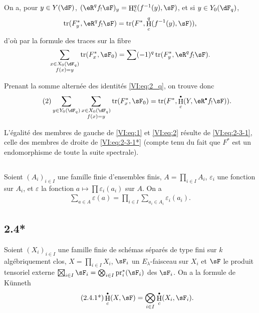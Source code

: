 \documentclass[oneside]{book}
\DeclareMathOperator{\h}{H}
\DeclareMathOperator{\tr}{tr}
\newcommand{\pr}{\mathrm{pr}} %
\theoremstyle{sga-source}
\theoremstyle{sga-source-dash}
\theoremstyle{sga-source-dotdash}
\theoremstyle{sga-source-number-note-dash}
\theoremstyle{sga-source-note-number-dotdash}
\theoremstyle{sga-source-example-dotdash}
\theoremstyle{sga-source-inline-number}
\theoremstyle{sga-source-bare-number}
\theoremstyle{sga-source}
\newcommand{\bigboxtimes}{\mathop{\vphantom{\sum}\mathchoice
  {\vcenter{\hbox{\huge $\boxtimes$}}}
  {\vcenter{\hbox{\Large $\boxtimes$}}}{\boxtimes}{\boxtimes}}\displaylimits}
\let\oldbullet\bullet
\renewcommand{\bullet}{\textnormal{\tiny$\oldbullet$}}
\newcommand{\PrintPage}[1]{}\newcommand{\MathPage}[1]{}\newcommand{\PrintCite}[2]{#1}\newcommand{\var}[3]{#2}
\begin{document}
On a, pour $y\in Y(\dF)$, $(\eR^q f_! \sF)_y = \h_c^q(f^{-1}(y),\sF)$, et si 
$y\in Y_0(\dF_q)$, 
\[
  \tr(F_y^\ast,\eR^q f_! \sF) = \tr(F^\ast,\h_c^q(f^{-1}(y),\sF)) \text{,}
\]
d'où par la formule des traces sur la fibre 
\[
  \sum_{\substack{x\in X_0(\dF_q) \\ f(x) = y}} \tr(F_x^\ast,\sF_0) = \sum (-1)^q \tr(F_y^\ast,\eR^q f_! \sF) \text{.}
\]
\PrintPage{185}
Prenant la somme alternée des identités \eqref{VI:eq:2_q}, on trouve donc 
\begin{align*}\tag{2}\label{VI:eq:2}
  \sum_{y\in Y_0(\dF_q)} \sum_{\substack{x \in X_0(\dF_q) \\ f(x) = y}} \tr(F_x^\ast,\sF_0) = \var{\tr(F^\ast,\h^\bullet(Y,\eR^\bullet f_! \sF))}{\tr(F^\ast,\h_c^\bullet(Y,\eR^\bullet f_! \sF))}{S45-SOL-0738} \text{.}
\end{align*}

L'égalité des membres de gauche de \eqref{VI:eq:1} et \eqref{VI:eq:2} 
résulte de \eqref{VI:eq:2-3-1}, celle des membres de droite de 
\eqref{VI:eq:2-3-1*} (compte tenu du fait que $F^\ast$ est un endomorphisme de 
toute la suite spectrale). 





\subsection{}\label{VI:2-4}

Soient $(A_i)_{i\in I}$ une famille finie d'ensembles finis, 
$A=\prod_{i\in I} A_i$, $\varepsilon_i$ une fonction sur $A_i$, et 
$\varepsilon$ la fonction $a\mapsto \prod \varepsilon_i(a_i)$ sur $A$. On a 
\begin{align*}\tag{2.4.1}\label{VI:eq:2-4-1}
  \sum_{a\in A} \varepsilon(a) = \prod_{i\in I} \sum_{a_i\in A_i} \varepsilon_i(a_i) \text{.}
\end{align*}





\subsection*{2.4*}\label{VI:2-4*}

Soient $(X_i)_{i\in I}$ une famille finie de schémas séparés de type fini 
sur $k$ algébriquement clos, $X=\prod_{i\in I} X_i$, $\sF_i$ un 
$E_\lambda$-faisceau sur $X_i$ et $\sF$ le produit tensoriel externe 
$\bigboxtimes_{i\in I}\sF_i = \bigotimes_{i\in I} \pr_i^\ast(\sF_i)$ 
des $\sF_i$. On a la formule de K\"unneth 
\begin{align*}\tag{2.4.1*}\label{VI:eq:2-4-1*}
  \h_c^\bullet(X,\sF) = \bigotimes_{i\in I} \h_c^\bullet(X_i,\sF_i) \text{.}
\end{align*}
\end{document}
